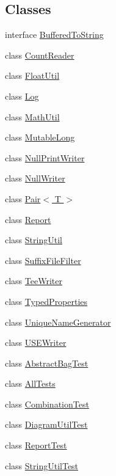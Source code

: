 \subsection*{Classes}
\begin{DoxyCompactItemize}
\item 
interface \hyperlink{interfaceorg_1_1tzi_1_1use_1_1util_1_1_buffered_to_string}{Buffered\-To\-String}
\item 
class \hyperlink{classorg_1_1tzi_1_1use_1_1util_1_1_count_reader}{Count\-Reader}
\item 
class \hyperlink{classorg_1_1tzi_1_1use_1_1util_1_1_float_util}{Float\-Util}
\item 
class \hyperlink{classorg_1_1tzi_1_1use_1_1util_1_1_log}{Log}
\item 
class \hyperlink{classorg_1_1tzi_1_1use_1_1util_1_1_math_util}{Math\-Util}
\item 
class \hyperlink{classorg_1_1tzi_1_1use_1_1util_1_1_mutable_long}{Mutable\-Long}
\item 
class \hyperlink{classorg_1_1tzi_1_1use_1_1util_1_1_null_print_writer}{Null\-Print\-Writer}
\item 
class \hyperlink{classorg_1_1tzi_1_1use_1_1util_1_1_null_writer}{Null\-Writer}
\item 
class \hyperlink{classorg_1_1tzi_1_1use_1_1util_1_1_pair_3_01_t_01_4}{Pair$<$ T $>$}
\item 
class \hyperlink{classorg_1_1tzi_1_1use_1_1util_1_1_report}{Report}
\item 
class \hyperlink{classorg_1_1tzi_1_1use_1_1util_1_1_string_util}{String\-Util}
\item 
class \hyperlink{classorg_1_1tzi_1_1use_1_1util_1_1_suffix_file_filter}{Suffix\-File\-Filter}
\item 
class \hyperlink{classorg_1_1tzi_1_1use_1_1util_1_1_tee_writer}{Tee\-Writer}
\item 
class \hyperlink{classorg_1_1tzi_1_1use_1_1util_1_1_typed_properties}{Typed\-Properties}
\item 
class \hyperlink{classorg_1_1tzi_1_1use_1_1util_1_1_unique_name_generator}{Unique\-Name\-Generator}
\item 
class \hyperlink{classorg_1_1tzi_1_1use_1_1util_1_1_u_s_e_writer}{U\-S\-E\-Writer}
\item 
class \hyperlink{classorg_1_1tzi_1_1use_1_1util_1_1_abstract_bag_test}{Abstract\-Bag\-Test}
\item 
class \hyperlink{classorg_1_1tzi_1_1use_1_1util_1_1_all_tests}{All\-Tests}
\item 
class \hyperlink{classorg_1_1tzi_1_1use_1_1util_1_1_combination_test}{Combination\-Test}
\item 
class \hyperlink{classorg_1_1tzi_1_1use_1_1util_1_1_diagram_util_test}{Diagram\-Util\-Test}
\item 
class \hyperlink{classorg_1_1tzi_1_1use_1_1util_1_1_report_test}{Report\-Test}
\item 
class \hyperlink{classorg_1_1tzi_1_1use_1_1util_1_1_string_util_test}{String\-Util\-Test}
\end{DoxyCompactItemize}
